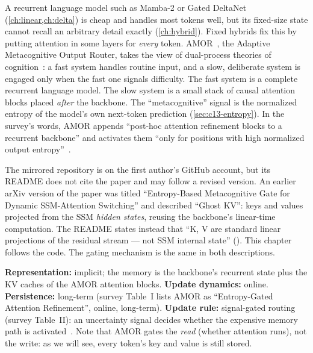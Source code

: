 A recurrent language model such as Mamba-2 or Gated DeltaNet (\cref{ch:linear,ch:delta}) is cheap
and handles most tokens well, but its fixed-size state cannot recall an arbitrary detail exactly
(\cref{ch:hybrid}). Fixed hybrids fix this by putting attention in some layers for \emph{every}
token. AMOR~\citep{zheng2026amor}, the Adaptive Metacognitive Output Router, takes the view of
dual-process theories of cognition~\citep{c13-kahneman2011}: a fast system handles routine input, and
a slow, deliberate system is engaged only when the fast one signals difficulty. The fast system is a
complete recurrent language model. The slow system is a small stack of causal attention blocks placed
\emph{after} the backbone. The ``metacognitive'' signal is the normalized entropy of the model's own
next-token prediction (\cref{sec:c13-entropy}). In the survey's words, AMOR appends ``post-hoc attention
refinement blocks to a recurrent backbone'' and activates them ``only for positions with high
normalized output entropy''~\citep{zhoubian2026memory}.

\begin{pitfall}[title={Which version of AMOR? Provenance of the code}]
The mirrored repository  is on the first author's GitHub account, but
its README does not cite the paper and may follow a revised version. An earlier arXiv version of the
paper was titled ``Entropy-Based Metacognitive Gate for Dynamic SSM-Attention Switching'' and
described ``Ghost KV'': keys and values projected from the SSM \emph{hidden states}, reusing the
backbone's linear-time computation. The README states instead that ``K, V are standard linear
projections of the residual stream --- not SSM internal state'' ().
This chapter follows the code. The gating mechanism is the same in both descriptions.
\end{pitfall}

\begin{taxonomy}
\textbf{Representation:} implicit; the memory is the backbone's recurrent state plus the KV
caches of the AMOR attention blocks. \textbf{Update dynamics:} online. \textbf{Persistence:} long-term
(survey Table~I lists AMOR as ``Entropy-Gated Attention Refinement'', online, long-term).
\textbf{Update rule:} signal-gated routing (survey Table~II): an uncertainty signal decides whether the
expensive memory path is activated~\citep{zhoubian2026memory}. Note that AMOR gates the \emph{read}
(whether attention runs), not the write: as we will see, every token's key and value is still stored.
\end{taxonomy}


